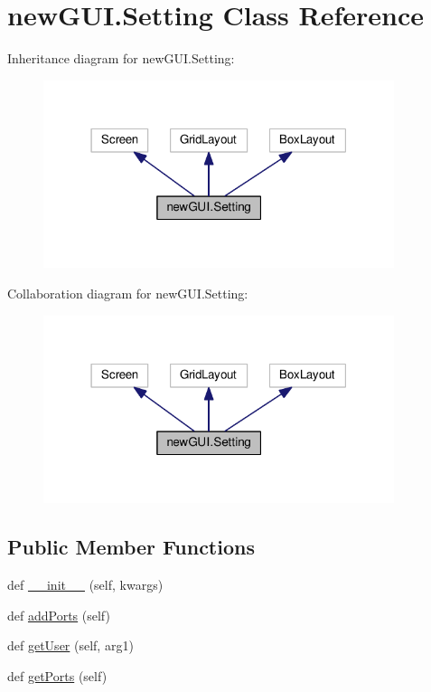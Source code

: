 \hypertarget{classnewGUI_1_1Setting}{}\section{new\+G\+U\+I.\+Setting Class Reference}
\label{classnewGUI_1_1Setting}


Inheritance diagram for new\+G\+U\+I.\+Setting\+:\nopagebreak
\begin{figure}[H]
\begin{center}
\leavevmode
\includegraphics[width=291pt]{classnewGUI_1_1Setting__inherit__graph}
\end{center}
\end{figure}


Collaboration diagram for new\+G\+U\+I.\+Setting\+:\nopagebreak
\begin{figure}[H]
\begin{center}
\leavevmode
\includegraphics[width=291pt]{classnewGUI_1_1Setting__coll__graph}
\end{center}
\end{figure}
\subsection*{Public Member Functions}
\begin{DoxyCompactItemize}
\item 
def \hyperlink{classnewGUI_1_1Setting_afc4784c819ae6cc24a81f0b5e85d8b0d}{\+\_\+\+\_\+init\+\_\+\+\_\+} (self, kwargs)
\item 
def \hyperlink{classnewGUI_1_1Setting_a2acee4bc5bc5099cc798d135615f4fa7}{add\+Ports} (self)
\item 
def \hyperlink{classnewGUI_1_1Setting_a347e30268cf3581d496d6a78c97cf6ad}{get\+User} (self, arg1)
\item 
def \hyperlink{classnewGUI_1_1Setting_a6737148d19d9ab0cd02fb433533dfc9e}{get\+Ports} (self)
\end{DoxyCompactItemize}
